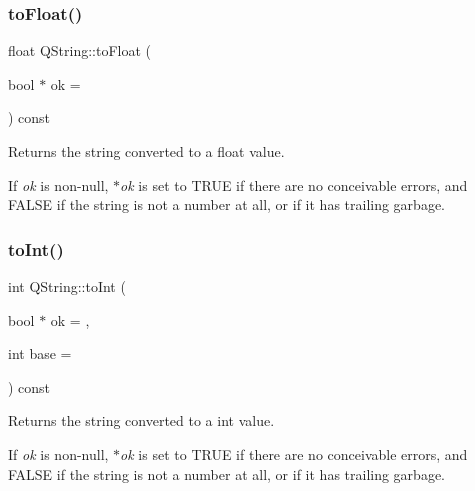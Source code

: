 \subsubsection{\texorpdfstring{toFloat()}{toFloat()}}
{\footnotesize\ttfamily float Q\+String\+::to\+Float (\begin{DoxyParamCaption}\item[{bool $\ast$}]{ok = {} }\end{DoxyParamCaption}) const}

Returns the string converted to a {\ttfamily float} value.

If {\itshape ok} is non-\/null, {\itshape $\ast$ok} is set to T\+R\+UE if there are no conceivable errors, and F\+A\+L\+SE if the string is not a number at all, or if it has trailing garbage. \mbox{\label{class_q_string_a98f691fb039c264a986142c833223efc}} 
\subsubsection{\texorpdfstring{toInt()}{toInt()}}
{\footnotesize\ttfamily int Q\+String\+::to\+Int (\begin{DoxyParamCaption}\item[{bool $\ast$}]{ok = {},  }\item[{int}]{base = {} }\end{DoxyParamCaption}) const}

Returns the string converted to a {\ttfamily int} value.


\begin{DoxyCode}{0}
\end{DoxyCode}


If {\itshape ok} is non-\/null, {\itshape $\ast$ok} is set to T\+R\+UE if there are no conceivable errors, and F\+A\+L\+SE if the string is not a number at all, or if it has trailing garbage. \mbox{\label{class_q_string_a3b79d2babc06fcbaec011fd9113e75ab}} 
